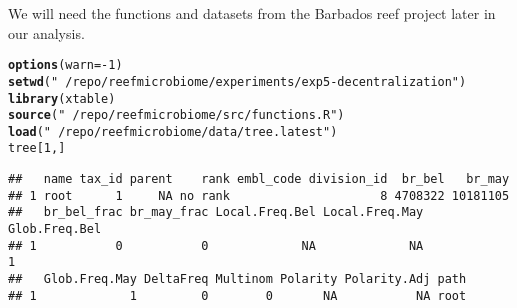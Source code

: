 \documentclass{article}\usepackage[]{graphicx}\usepackage[]{color}
\makeatletter
\newcommand{\hlnum}[1]{\textcolor[rgb]{0.686,0.059,0.569}{#1}}%
\newcommand{\hlstr}[1]{\textcolor[rgb]{0.192,0.494,0.8}{#1}}%
\newcommand{\hlopt}[1]{\textcolor[rgb]{0,0,0}{#1}}%
\newcommand{\hlstd}[1]{\textcolor[rgb]{0.345,0.345,0.345}{#1}}%
\newcommand{\hlkwc}[1]{\textcolor[rgb]{0.333,0.667,0.333}{#1}}%
\newcommand{\hlkwd}[1]{\textcolor[rgb]{0.737,0.353,0.396}{\textbf{#1}}}%
\newenvironment{kframe}{%
 \def\at@end@of@kframe{}%
 \ifinner\ifhmode%
  \def\at@end@of@kframe{\end{minipage}}%
  \begin{minipage}{\columnwidth}%
 \fi\fi%
 \def\FrameCommand##1{\hskip\@totalleftmargin \hskip-\fboxsep
 \colorbox{shadecolor}{##1}\hskip-\fboxsep
     \hskip-\linewidth \hskip-\@totalleftmargin \hskip\columnwidth}%
 \MakeFramed {\advance\hsize-\width
   \@totalleftmargin\z@ \linewidth\hsize
   \@setminipage}}%
 {\par\unskip\endMakeFramed%
 \at@end@of@kframe}
\newenvironment{knitrout}{}{} %
\makeatother
\begin{document}
We will need the functions and datasets from the Barbados reef project later in our analysis.
\begin{knitrout}
\color{fgcolor}\begin{kframe}
\begin{alltt}
\hlkwd{options}\hlstd{(}\hlkwc{warn} \hlstd{=} \hlopt{-}\hlnum{1}\hlstd{)}
\hlkwd{setwd}\hlstd{(}\hlstr{"~/repo/reefmicrobiome/experiments/exp5-decentralization"}\hlstd{)}
\hlkwd{library}\hlstd{(xtable)}
\hlkwd{source}\hlstd{(}\hlstr{"~/repo/reefmicrobiome/src/functions.R"}\hlstd{)}
\hlkwd{load}\hlstd{(}\hlstr{"~/repo/reefmicrobiome/data/tree.latest"}\hlstd{)}
\hlstd{tree[}\hlnum{1}\hlstd{,]}
\end{alltt}
\begin{verbatim}
##   name tax_id parent    rank embl_code division_id  br_bel   br_may
## 1 root      1     NA no rank                     8 4708322 10181105
##   br_bel_frac br_may_frac Local.Freq.Bel Local.Freq.May Glob.Freq.Bel
## 1           0           0             NA             NA             1
##   Glob.Freq.May DeltaFreq Multinom Polarity Polarity.Adj path
## 1             1         0        0       NA           NA root
\end{verbatim}
\end{kframe}
\end{knitrout}
\end{document}
